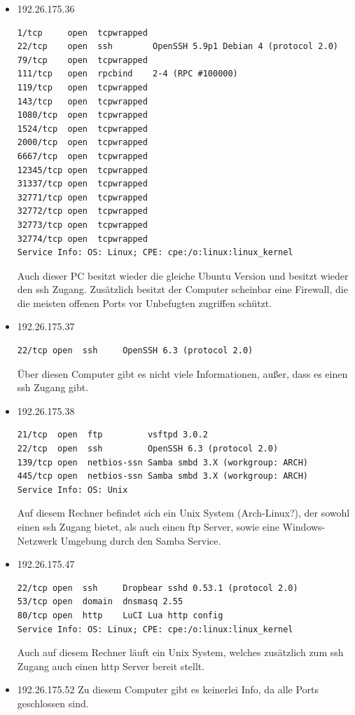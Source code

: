 \documentclass[10pt,a4paper]{article}
\begin{document}
\begin{itemize}
\item 192.26.175.36
\begin{verbatim}
1/tcp     open  tcpwrapped
22/tcp    open  ssh        OpenSSH 5.9p1 Debian 4 (protocol 2.0)
79/tcp    open  tcpwrapped
111/tcp   open  rpcbind    2-4 (RPC #100000)
119/tcp   open  tcpwrapped
143/tcp   open  tcpwrapped
1080/tcp  open  tcpwrapped
1524/tcp  open  tcpwrapped
2000/tcp  open  tcpwrapped
6667/tcp  open  tcpwrapped
12345/tcp open  tcpwrapped
31337/tcp open  tcpwrapped
32771/tcp open  tcpwrapped
32772/tcp open  tcpwrapped
32773/tcp open  tcpwrapped
32774/tcp open  tcpwrapped
Service Info: OS: Linux; CPE: cpe:/o:linux:linux_kernel
\end{verbatim}
Auch dieser PC besitzt wieder die gleiche Ubuntu Version und besitzt wieder den ssh Zugang. Zusätzlich besitzt der Computer scheinbar eine Firewall, die die meisten offenen Ports vor Unbefugten zugriffen schützt.

\item 192.26.175.37
\begin{verbatim}
22/tcp open  ssh     OpenSSH 6.3 (protocol 2.0)
\end{verbatim}
Über diesen Computer gibt es nicht viele Informationen, außer, dass es einen ssh Zugang gibt.

\item 192.26.175.38
\begin{verbatim}
21/tcp  open  ftp         vsftpd 3.0.2
22/tcp  open  ssh         OpenSSH 6.3 (protocol 2.0)
139/tcp open  netbios-ssn Samba smbd 3.X (workgroup: ARCH)
445/tcp open  netbios-ssn Samba smbd 3.X (workgroup: ARCH)
Service Info: OS: Unix
\end{verbatim}
Auf diesem Rechner befindet sich ein Unix System (Arch-Linux?), der sowohl einen ssh Zugang bietet, als auch einen ftp Server, sowie eine Windows-Netzwerk Umgebung durch den Samba Service.

\item 192.26.175.47
\begin{verbatim}
22/tcp open  ssh     Dropbear sshd 0.53.1 (protocol 2.0)
53/tcp open  domain  dnsmasq 2.55
80/tcp open  http    LuCI Lua http config
Service Info: OS: Linux; CPE: cpe:/o:linux:linux_kernel
\end{verbatim}
Auch auf diesem Rechner läuft ein Unix System, welches zusätzlich zum ssh Zugang auch einen http Server bereit stellt.

\item 192.26.175.52
Zu diesem Computer gibt es keinerlei Info, da alle Ports geschlossen sind.


\end{itemize}
\end{document}

